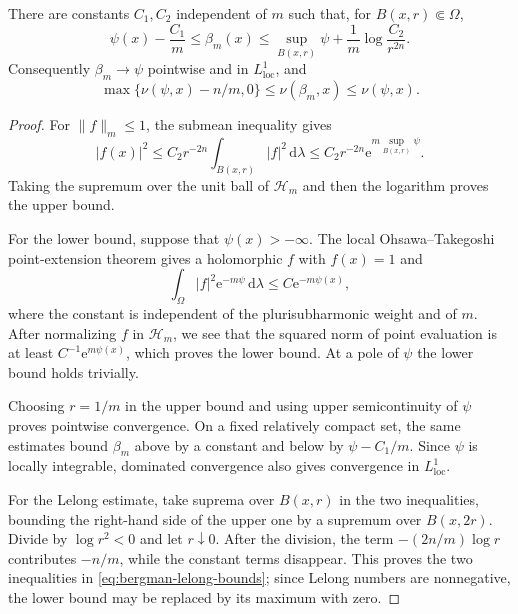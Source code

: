 \begin{proposition}\label{prop:bergman-local-estimates}
There are constants $C_1,C_2$ independent of $m$ such that, for $B(x,r)\Subset\Omega$,
\begin{equation}\label{eq:bergman-local-estimates}
 \psi(x)-\frac{C_1}{m}
 \leq\beta_m(x)
 \leq\sup_{B(x,r)}\psi+\frac1m\log\frac{C_2}{r^{2n}}.
\end{equation}
Consequently $\beta_m\to\psi$ pointwise and in $L^1_{\mathrm{loc}}$, and
\begin{equation}\label{eq:bergman-lelong-bounds}
 \max\{\nu(\psi,x)-n/m,0\}
 \leq\nu(\beta_m,x)\leq\nu(\psi,x).
\end{equation}
\end{proposition}
\begin{proof}
For $\|f\|_m\leq1$, the submean inequality gives
\[
 |f(x)|^2
 \leq C_2r^{-2n}\int_{B(x,r)}|f|^2\,\mathrm{d}\lambda
 \leq C_2r^{-2n}\mathrm{e}^{m\sup_{B(x,r)}\psi}.
\]
Taking the supremum over the unit ball of $\mathcal H_m$ and then the logarithm proves the upper bound.

For the lower bound, suppose that $\psi(x)>-\infty$. The local Ohsawa--Takegoshi point-extension theorem gives a holomorphic $f$ with $f(x)=1$ and
\[
 \int_\Omega|f|^2\mathrm{e}^{-m\psi}\,\mathrm{d}\lambda
 \leq C \mathrm{e}^{-m\psi(x)},
\]
where the constant is independent of the plurisubharmonic weight and of $m$. After normalizing $f$ in $\mathcal H_m$, we see that the squared norm of point evaluation is at least $C^{-1}\mathrm{e}^{m\psi(x)}$, which proves the lower bound. At a pole of $\psi$ the lower bound holds trivially.

Choosing $r=1/m$ in the upper bound and using upper semicontinuity of $\psi$ proves pointwise convergence. On a fixed relatively compact set, the same estimates bound $\beta_m$ above by a constant and below by $\psi-C_1/m$. Since $\psi$ is locally integrable, dominated convergence also gives convergence in $L^1_{\mathrm{loc}}$.

For the Lelong estimate, take suprema over $B(x,r)$ in the two inequalities, bounding the right-hand side of the upper one by a supremum over $B(x,2r)$. Divide by $\log r^2<0$ and let $r\downarrow0$. After the division, the term $-(2n/m)\log r$ contributes $-n/m$, while the constant terms disappear. This proves the two inequalities in \eqref{eq:bergman-lelong-bounds}; since Lelong numbers are nonnegative, the lower bound may be replaced by its maximum with zero.
\end{proof}

